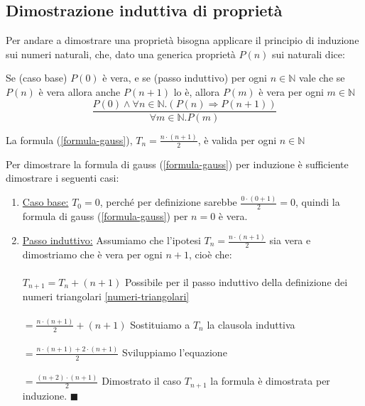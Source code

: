 \subsection{Dimostrazione induttiva di proprietà}
Per andare a dimostrare una proprietà bisogna applicare il principio di induzione sui numeri naturali, che, dato una generica proprietà $P(n)$ sui naturali dice:
\begin{definition}
    Se (caso base) $P(0)$ è vera, e se (passo induttivo) per ogni $n \in \mathbb{N}$ vale che se $P(n)$ è vera allora anche $P(n+1)$ lo è, allora $P(m)$ è vera per ogni $m \in \mathbb{N}$
    \begin{equation}
        \frac{P(0) \wedge \forall n \in \mathbb{N}.(P(n) \Rightarrow P(n+1))}{\forall m \in \mathbb{N}.P(m)}
    \end{equation}
\end{definition}
\begin{proposition}
La formula (\ref{formula-gauss}), $T_n = \frac{n \cdot (n + 1)}{2}$, è valida per ogni $n \in \mathbb{N}$
\end{proposition}
\begin{demostration}
Per dimostrare la formula di gauss (\ref{formula-gauss}) per induzione è sufficiente dimostrare i seguenti casi:
\begin{enumerate}
    \item \underline{Caso base:} $T_0 = 0$, perché per definizione sarebbe $\frac{0 \cdot (0 + 1)}{2} = 0$, quindi la formula di gauss (\ref{formula-gauss}) per $n = 0$ è vera.
    \item \underline{Passo induttivo:} Assumiamo che l'ipotesi $T_n = \frac{n \cdot (n + 1)}{2}$ sia vera e dimostriamo che è vera per ogni $n + 1$, cioè che:\\\\
    $T_{n+1} = T_n + (n + 1)$ \hspace{.5cm} Possibile per il passo induttivo della definizione dei numeri triangolari \ref{numeri-triangolari} \\\\
    $= \frac{n \cdot (n + 1)}{2} + (n + 1)$ \hspace{.5cm} Sostituiamo a $T_n$ la clausola induttiva\\\\
    $= \frac{n \cdot (n + 1) + 2 \cdot (n + 1)}{2}$ \hspace{.5cm} Sviluppiamo l'equazione\\\\
    $= \frac{(n + 2) \cdot (n + 1)}{2}$  \hspace{.5cm} Dimostrato il caso $T_{n+1}$ la formula è dimostrata per induzione. \: \: $\blacksquare$
\end{enumerate}
\end{demostration}
